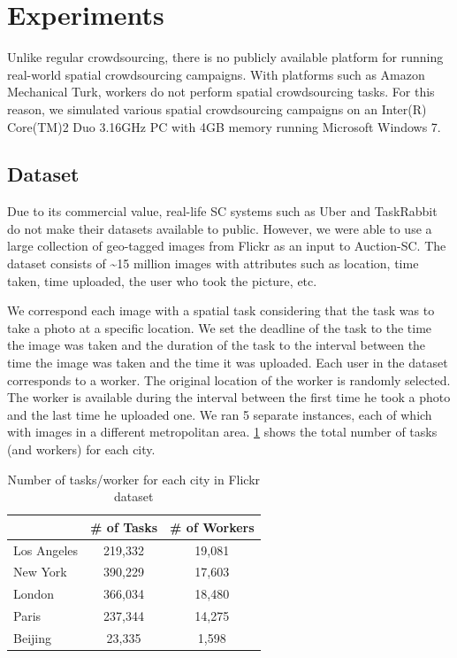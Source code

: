 \section{Experiments}
\label{sec:experiments}
Unlike regular crowdsourcing, there is no publicly available platform for running real-world spatial crowdsourcing campaigns. With platforms such as Amazon Mechanical Turk, workers do not perform spatial crowdsourcing tasks. For this reason, we simulated various spatial crowdsourcing campaigns on an Inter(R) Core(TM)2 Duo 3.16GHz PC with 4GB memory running Microsoft Windows 7.

\subsection{Dataset}
\label{subsec:dataset}
Due to its commercial value, real-life SC systems such as Uber and TaskRabbit do not make their datasets available to public. However, we were able to use a large collection of geo-tagged images from Flickr \cite{Thomee15} as an input to Auction-SC. The dataset consists of \textasciitilde 15 million images with attributes such as location, time taken, time uploaded, the user who took the picture, etc.

We correspond each image with a spatial task considering that the task was to take a photo at a specific location. We set the deadline of the task to the time the image was taken and the duration of the task to the interval between the time the image was taken and the time it was uploaded. Each user in the dataset corresponds to a worker. The original location of the worker is randomly selected. The worker is available during the interval between the first time he took a photo and the last time he uploaded one. We ran 5 separate instances, each of which with images in a different metropolitan area. \cref{tab:flickr_stats} shows the total number of tasks (and workers) for each city. 

\begin{table}[h]
\begin{center}
\begin{tabular}{| l || c | c |} \hline
			&	\# of Tasks	&	\# of Workers	\\ \hline
Los Angeles	&	219,332		&		19,081		\\ \hline
New York	&	390,229		&		17,603		\\ \hline
London		& 	366,034		&		18,480		\\ \hline
Paris		&	237,344		&		14,275		\\ \hline
Beijing		&	23,335		&		1,598		\\ \hline
\end{tabular}
\vspace{-0.1in}
\caption{\small{Number of tasks/worker for each city in Flickr dataset}}
\label{tab:flickr_stats}
\end{center}
\end{table}


